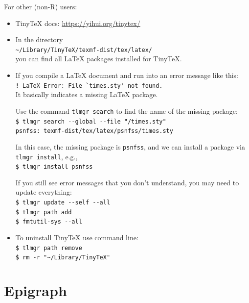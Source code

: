 \documentclass[letterpaper]{article}
\begin{document}
For other (non-R) users:
\begin{itemize}

    \item TinyTeX docs: \url{https://yihui.org/tinytex/}

    \item In the directory \\
          \verb|~/Library/TinyTeX/texmf-dist/tex/latex/| \\
          you can find all \LaTeX{} packages installed for TinyTeX.
    
    \item If you compile a LaTeX document and run into an error message 
          like this:\\
          \verb+! LaTeX Error: File `times.sty' not found.+ \\
          It basically indicates a missing LaTeX package.

          Use the command \verb+tlmgr search+ to find the name of 
          the missing package:\\
          \verb+$ tlmgr search --global --file "/times.sty"+\\
          \verb+psnfss: texmf-dist/tex/latex/psnfss/times.sty+

          In this case, the missing package is \verb+psnfss+, and we 
          can install a package via \verb+tlmgr install+, e.g., \\
          \verb+$ tlmgr install psnfss+

          If you still see error messages that you don’t understand, 
          you may need to update everything:\\
          \verb+$ tlmgr update --self --all+\\
          \verb+$ tlmgr path add+\\
          \verb+$ fmtutil-sys --all+
    
    \item To uninstall TinyTeX use command line:\\
          \verb+$ tlmgr path remove+\\
          \verb+$ rm -r "~/Library/TinyTeX"+
          
\end{itemize}


\section{Epigraph}
\end{document}
